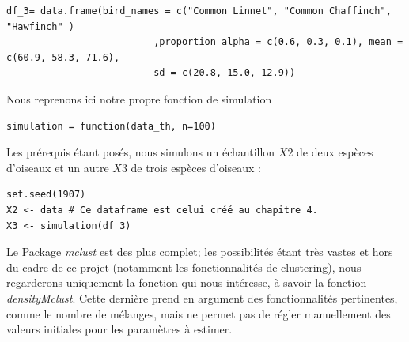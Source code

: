 \documentclass[frenchb]{report}
\newcommand{\1}{\mathbbm{1}}
\theoremstyle{definition}\newtheorem{defn}{Définition}
\theoremstyle{definition}\newtheorem{exm}{Exemple}
\theoremstyle{definition}\newtheorem{nota}{Notation}
\theoremstyle{definition}\newtheorem{rem}{Remarque}
\begin{document}
\begin{appendices}
\begin{lstlisting}
df_3= data.frame(bird_names = c("Common Linnet", "Common Chaffinch", "Hawfinch" )
                          ,proportion_alpha = c(0.6, 0.3, 0.1), mean = c(60.9, 58.3, 71.6),
                          sd = c(20.8, 15.0, 12.9))
\end{lstlisting}
%
Nous reprenons ici notre propre fonction de simulation
\begin{lstlisting}
simulation = function(data_th, n=100)
\end{lstlisting}
%
Les prérequis étant posés, nous simulons un échantillon $X2$ de deux espèces d'oiseaux et un autre $X3$ de trois espèces d'oiseaux :
\begin{lstlisting}
set.seed(1907)
X2 <- data # Ce dataframe est celui créé au chapitre 4.
X3 <- simulation(df_3)
\end{lstlisting}
%
Le Package \textit{mclust} est des plus complet; les possibilités étant très vastes et hors du cadre de ce projet (notamment les fonctionnalités de clustering), nous regarderons uniquement la fonction qui nous intéresse, à savoir la fonction \textit{densityMclust}. \newline
Cette dernière prend en argument des fonctionnalités pertinentes, comme le nombre de mélanges, mais ne permet pas de régler manuellement des valeurs initiales pour les paramètres à estimer.
%


\end{appendices}
\end{document}
